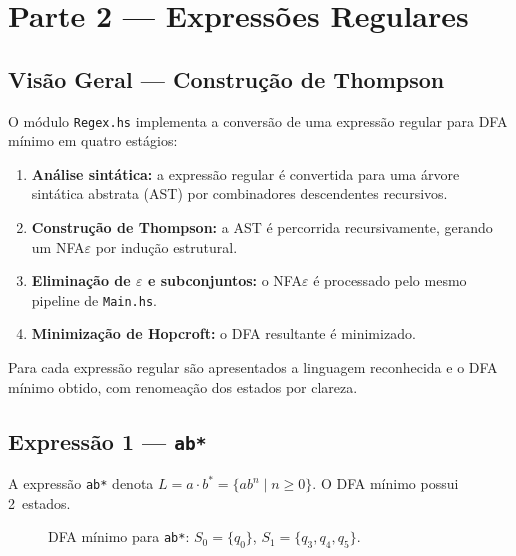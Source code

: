 \documentclass[sumario=abnt-6027-2012]{ifes8}
\newcommand{\rx}[1]{\texttt{#1}}
\begin{document}
\chapter{Parte 2 --- Expressões Regulares}

\section{Visão Geral --- Construção de Thompson}

O módulo \texttt{Regex.hs} implementa a conversão de uma expressão regular
para DFA mínimo em quatro estágios:

\begin{enumerate}
  \item \textbf{Análise sintática:} a expressão regular é convertida para
    uma árvore sintática abstrata (AST) por combinadores descendentes
    recursivos.
  \item \textbf{Construção de Thompson:} a AST é percorrida recursivamente,
    gerando um NFA$\varepsilon$ por indução estrutural.
  \item \textbf{Eliminação de $\varepsilon$ e subconjuntos:} o
    NFA$\varepsilon$ é processado pelo mesmo pipeline de \texttt{Main.hs}.
  \item \textbf{Minimização de Hopcroft:} o DFA resultante é minimizado.
\end{enumerate}

Para cada expressão regular são apresentados a linguagem reconhecida e o
DFA mínimo obtido, com renomeação dos estados por clareza.

\section{Expressão 1 --- \rx{ab*}}

A expressão \rx{ab*} denota $L = a \cdot b^* = \{ab^n \mid n \geq 0\}$.
O DFA mínimo possui 2~estados.

\begin{figure}[H]
  \centering
  \caption{DFA mínimo para \rx{ab*}: $S_0 = \{q_0\}$,
    $S_1 = \{q_3,q_4,q_5\}$.}
  \label{fig:dfa-regex1}
\end{figure}
\end{document}
